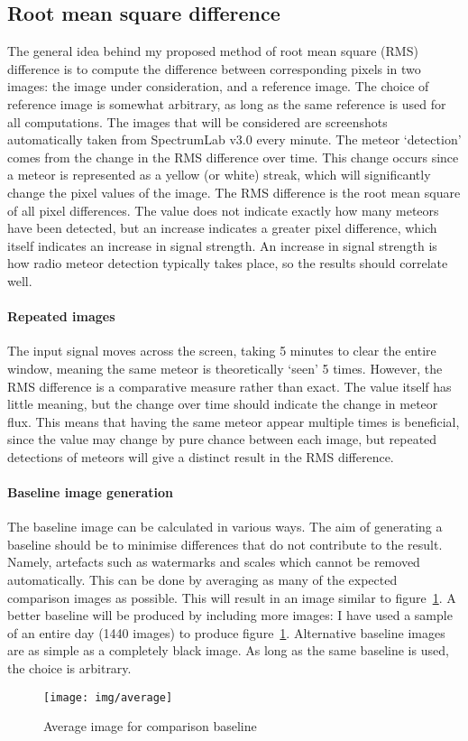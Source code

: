 \subsection{Root mean square difference}
The general idea behind my proposed method of root mean square (RMS) difference is to compute the difference between corresponding pixels in two images: the image under consideration, and a reference image. The choice of reference image is somewhat arbitrary, as long as the same reference is used for all computations. The images that will be considered are screenshots automatically taken from SpectrumLab v3.0 \cite{speclab} every minute. The meteor `detection' comes from the change in the RMS difference over time. This change occurs since a meteor is represented as a yellow (or white) streak, which will significantly change the pixel values of the image. The RMS difference is the root mean square of all pixel differences. The value does not indicate exactly how many meteors have been detected, but an increase indicates a greater pixel difference, which itself indicates an increase in signal strength. An increase in signal strength is how radio meteor detection typically takes place, so the results should correlate well.
\paragraph{Repeated images\\}
The input signal moves across the screen, taking 5 minutes to clear the entire window, meaning the same meteor is theoretically `seen' 5 times. However, the RMS difference is a comparative measure rather than exact. The value itself has little meaning, but the change over time should indicate the change in meteor flux. This means that having the same meteor appear multiple times is beneficial, since the value may change by pure chance between each image, but repeated detections of meteors will give a distinct result in the RMS difference.\\
\paragraph{Baseline image generation\\}
The baseline image can be calculated in various ways. The aim of generating a baseline should be to minimise differences that do not contribute to the result. Namely, artefacts such as watermarks and scales which cannot be removed automatically. This can be done by averaging as many of the expected comparison images as possible. This will result in an image similar to figure~\ref{fig:img:avg}. A better baseline will be produced by including more images: I have used a sample of an entire day (1440 images) to produce figure~\ref{fig:img:avg}. Alternative baseline images are as simple as a completely black image. As long as the same baseline is used, the choice is arbitrary.
\begin{figure}
	\centering
	\texttt{[image: img/average]}
	\caption{Average image for comparison baseline
		\label{fig:img:avg}}
\end{figure}

